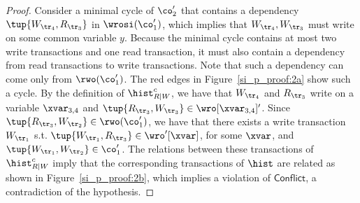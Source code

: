 \begin{proof}
Consider a minimal cycle of $\co_2'$ that contains a dependency $\tup{W_{\tr_4}, R_{\tr_3}}$ in $\wrosi(\co'_1)$, which implies that $W_{\tr_4}, W_{\tr_3}$ must write on some common variable $y$. Because the minimal cycle contains at most two write transactions and one read transaction, it must also contain a dependency from read transactions to write transactions. Note that such a dependency can come only from $\rwo(\co'_1)$.
The red edges in Figure~\ref{si_p_proof:2a} show such a cycle. By the definition of $\hist_{R|W}^c$, we have that $W_{\tr_4}$ and $R_{\tr_3}$ write on a variable $\xvar_{3,4}$ and $\tup{R_{\tr_3}, W_{\tr_3}} \in \wro[\xvar_{3,4}]'$. Since $\tup{R_{\tr_3}, W_{\tr_2}}\in \rwo(\co'_1)$, we have that there exists a write transaction $W_{\tr_1}$ s.t. $\tup{W_{\tr_1}, R_{\tr_3}}\in \wro'[\xvar]$, for some $\xvar$, and $\tup{W_{\tr_1}, W_{\tr_2}}\in \co'_1$.
The relations between these transactions of $\hist_{R|W}^c$ imply that the corresponding transactions of $\hist$ are related as shown in Figure~\ref{si_p_proof:2b}, which implies a violation of $\mathsf{Conflict}$, a contradiction of the hypothesis.


 

\end{proof}
